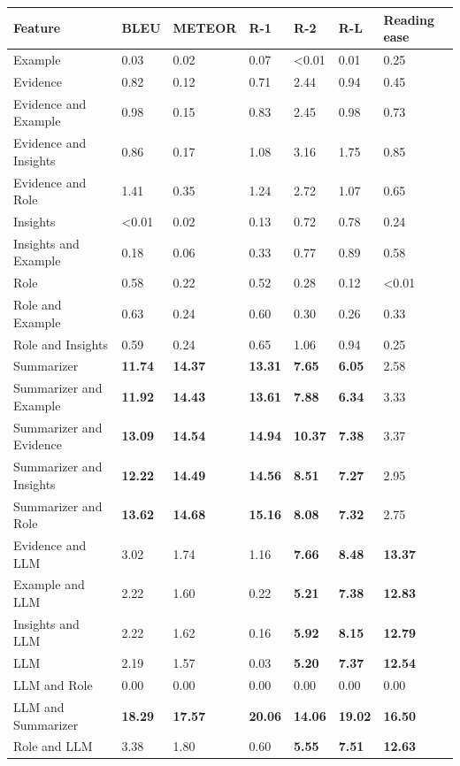 \begin{tabular}{|l|l|l|l|l|l|l|}
\hline
\textbf{Feature} & BLEU & METEOR & R-1 & R-2 & R-L & Reading ease \\
 \hline
 Example & 0.03 & 0.02 & 0.07 & \textless{}0.01 & 0.01 & 0.25 \\
 \hline
 Evidence & 0.82 & 0.12 & 0.71 & 2.44 & 0.94 & 0.45 \\
 \hline
 Evidence and Example & 0.98 & 0.15 & 0.83 & 2.45 & 0.98 & 0.73 \\
 \hline
 Evidence and Insights & 0.86 & 0.17 & 1.08 & 3.16 & 1.75 & 0.85 \\
 \hline
 Evidence and Role & 1.41 & 0.35 & 1.24 & 2.72 & 1.07 & 0.65 \\
 \hline
 Insights & \textless{}0.01 & 0.02 & 0.13 & 0.72 & 0.78 & 0.24 \\
 \hline
 Insights and Example & 0.18 & 0.06 & 0.33 & 0.77 & 0.89 & 0.58 \\
 \hline
 Role & 0.58 & 0.22 & 0.52 & 0.28 & 0.12 & \textless{}0.01 \\
 \hline
 Role and Example & 0.63 & 0.24 & 0.60 & 0.30 & 0.26 & 0.33 \\
 \hline
 Role and Insights & 0.59 & 0.24 & 0.65 & 1.06 & 0.94 & 0.25 \\
 \hline
 Summarizer & \textbf{11.74} & \textbf{14.37} & \textbf{13.31} & \textbf{7.65} & \textbf{6.05} & 2.58 \\
 \hline
 Summarizer and Example & \textbf{11.92} & \textbf{14.43} & \textbf{13.61} & \textbf{7.88} & \textbf{6.34} & 3.33 \\
 \hline
 Summarizer and Evidence & \textbf{13.09} & \textbf{14.54} & \textbf{14.94} & \textbf{10.37} & \textbf{7.38} & 3.37 \\
 \hline
 Summarizer and Insights & \textbf{12.22} & \textbf{14.49} & \textbf{14.56} & \textbf{8.51} & \textbf{7.27} & 2.95 \\
 \hline
 Summarizer and Role & \textbf{13.62} & \textbf{14.68} & \textbf{15.16} & \textbf{8.08} & \textbf{7.32} & 2.75 \\
 \hline
 Evidence and LLM & 3.02 & 1.74 & 1.16 & \textbf{7.66} & \textbf{8.48} & \textbf{13.37} \\
 \hline
 Example and LLM & 2.22 & 1.60 & 0.22 & \textbf{5.21} & \textbf{7.38} & \textbf{12.83} \\
 \hline
 Insights and LLM & 2.22 & 1.62 & 0.16 & \textbf{5.92} & \textbf{8.15} & \textbf{12.79} \\
 \hline
 LLM & 2.19 & 1.57 & 0.03 & \textbf{5.20} & \textbf{7.37} & \textbf{12.54} \\
 \hline
 LLM and Role & 0.00 & 0.00 & 0.00 & 0.00 & 0.00 & 0.00 \\
 \hline
 LLM and Summarizer & \textbf{18.29} & \textbf{17.57} & \textbf{20.06} & \textbf{14.06} & \textbf{19.02} & \textbf{16.50} \\
 \hline
 Role and LLM & 3.38 & 1.80 & 0.60 & \textbf{5.55} & \textbf{7.51} & \textbf{12.63} \\
\hline
\end{tabular}
